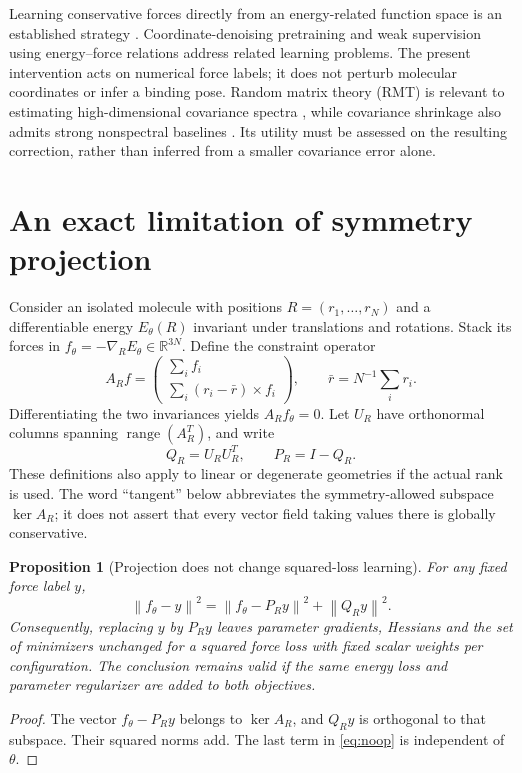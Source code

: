 \documentclass[11pt]{article}
\newtheorem{proposition}{Proposition}
\newcommand{\R}{\mathbb{R}}
\newcommand{\norm}[1]{\left\lVert #1\right\rVert}
\begin{document}
Learning conservative forces directly from an energy-related function space is an
established strategy \citep{chmiela2017}. Coordinate-denoising pretraining
\citep{wang2023} and weak supervision using energy--force relations
\citep{takamoto2024} address related learning problems. The present intervention acts
on numerical force labels; it does not perturb molecular coordinates or infer a
binding pose. Random matrix theory (RMT) is relevant to estimating high-dimensional
covariance spectra \citep{marchenko1967,donoho2017}, while covariance shrinkage also
admits strong nonspectral baselines \citep{chen2009}. Its utility must be assessed on
the resulting correction, rather than inferred from a smaller covariance error alone.

\section{An exact limitation of symmetry projection}
Consider an isolated molecule with positions $R=(r_1,\ldots,r_N)$ and a differentiable
energy $E_\theta(R)$ invariant under translations and rotations. Stack its forces in
$f_\theta=-\nabla_R E_\theta\in\R^{3N}$. Define the constraint operator
\begin{equation}
 A_R f=\begin{pmatrix}\sum_i f_i\\\sum_i (r_i-\bar r)\times f_i\end{pmatrix},
 \qquad \bar r=N^{-1}\sum_i r_i.
\end{equation}
Differentiating the two invariances yields $A_R f_\theta=0$. Let $U_R$ have orthonormal
columns spanning $\operatorname{range}(A_R^T)$, and write
\begin{equation}
 Q_R=U_RU_R^T,\qquad P_R=I-Q_R.
\end{equation}
These definitions also apply to linear or degenerate geometries if the actual rank
is used. The word ``tangent'' below abbreviates the symmetry-allowed subspace
$\ker A_R$; it does not assert that every vector field taking values there is
globally conservative.

\begin{proposition}[Projection does not change squared-loss learning]
For any fixed force label $y$,
\begin{equation}\label{eq:noop}
 \norm{f_\theta-y}^2=\norm{f_\theta-P_Ry}^2+\norm{Q_Ry}^2.
\end{equation}
Consequently, replacing $y$ by $P_Ry$ leaves parameter gradients, Hessians and the
set of minimizers unchanged for a squared force loss with fixed scalar weights per
configuration. The conclusion remains valid if the same energy loss and parameter
regularizer are added to both objectives.
\end{proposition}
\begin{proof}
The vector $f_\theta-P_Ry$ belongs to $\ker A_R$, and $Q_Ry$ is orthogonal to that
subspace. Their squared norms add. The last term in \eqref{eq:noop} is independent
of $\theta$.
\end{proof}
\end{document}
